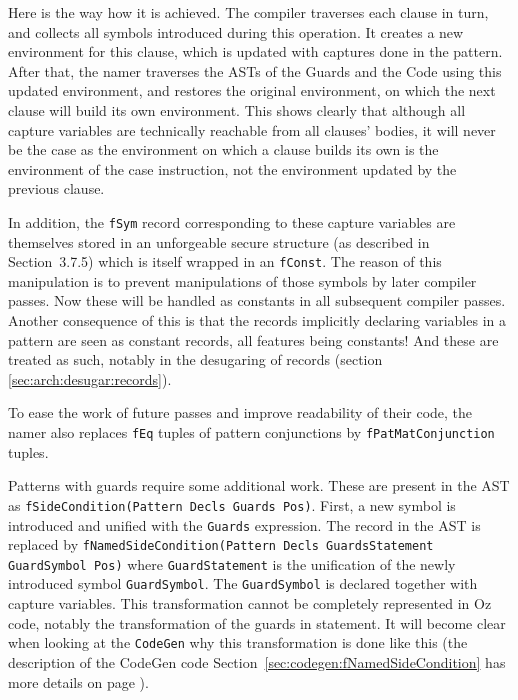 \documentclass[a4paper]{memoir}
\begin{document}
Here is the way how it is achieved. The compiler traverses each clause in turn,
and collects all symbols introduced during this operation. It creates a new
environment for this clause, which is updated with captures done in the
pattern. After that, the namer traverses the ASTs of the Guards and the Code
using this updated environment, and restores the original environment, on which
the next clause will build its own environment. This shows clearly that
although all capture variables are technically reachable from all clauses'
bodies, it will never be the case as the environment on which a clause builds
its own is the environment of the case instruction, not the environment updated
by the previous clause. 

In addition, the \lstinline!fSym! record corresponding to these capture
variables are themselves stored in an unforgeable secure structure (as
described in \cite{CTMCP} Section~3.7.5) which is itself wrapped in an
\lstinline!fConst!. The reason of this manipulation is to prevent manipulations
of those symbols by later compiler passes. Now these will be handled as
constants in all subsequent compiler passes. Another consequence of this is
that the records implicitly declaring variables in a pattern are seen as
constant records, all features being constants! And these are treated as such,
notably in the desugaring of records (section \ref{sec:arch:desugar:records}).

To ease the work of future passes and improve readability of their code, the
namer also replaces \lstinline!fEq! tuples of pattern conjunctions by
\lstinline!fPatMatConjunction! tuples.

Patterns with guards require some additional work. These are present in the AST
as \lstinline!fSideCondition(Pattern Decls Guards Pos)!. First, a new symbol is
introduced and unified with the \lstinline!Guards! expression. The record in the
AST is replaced by \lstinline!fNamedSideCondition(Pattern Decls GuardsStatement GuardSymbol Pos)! 
where \lstinline!GuardStatement! is the unification of the newly
introduced symbol \lstinline!GuardSymbol!. The \lstinline!GuardSymbol! is
declared together with capture variables. 
This transformation cannot be completely represented in Oz code, notably the
transformation of the guards in statement. It will become clear when looking at
the \lstinline!CodeGen! why this transformation is done like this (the
description of the CodeGen code Section~\ref{sec:codegen:fNamedSideCondition} has more
details on page \pageref{sec:codegen:fNamedSideCondition}).
\end{document}
